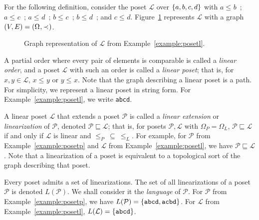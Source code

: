 \documentclass[12pt]{llncs}
\DeclarePairedDelimiter{\set}{\{}{\}}
\DeclarePairedDelimiter{\tuple}{(}{)}
\let\oldleq\leq
\renewcommand{\leq}[1][]{\oldleq_{#1}}
\newcommand{\poset}[1]{\mathcal{#1}}
\newcommand{\uni}[1][]{\Omega_{#1}}
\newcommand{\lang}[1]{L(#1)}
\newcommand{\lin}[1]{\texttt{#1}}
\newcommand{\lext}{\sqsubseteq}
\newcommand{\covered}[1][]{\prec_{#1}}
\begin{document}
\begin{example}
    For the following definition, consider the poset $\poset{L}$ over $\set{a,b,c,d}$ with $a \leq b$\ ; $a \leq c$\ ; $a \leq d$\ ; $b \leq c$\ ; $b \leq d$\ ; and $c \leq d$. Figure~\ref{figure:posetl} represents $\poset{L}$ with a graph $\tuple{V,E} = \tuple{\uni,\covered}$.
    \label{example:posetl}
\end{example}

\begin{figure}[H]
    \centering
    \caption{Graph representation of $\poset{L}$ from Example~\ref{example:posetl}.}
    \label{figure:posetl}
\end{figure}

A partial order where every pair of elements is comparable is called a \emph{linear order}, and a poset $\poset{L}$ with such an order is called a \emph{linear poset}; that is, for $x, y \!\in\! \poset{L}$, $x \leq y$ or $y \leq x$. Note that the graph describing a linear poset is a path. For simplicity, we represent a linear poset in string form. For Example~\ref{example:posetl}, we write \lin{abcd}.

A linear poset $\poset{L}$ that extends a poset $\poset{P}$ is called a \emph{linear extension} or \emph{linearization} of $\poset{P}$, denoted $\poset{P} \lext \poset{L}$; that is, for posets $\poset{P},\poset{L}$ with $\uni[P] \!=\! \uni[L]$, $\poset{P} \lext \poset{L}$ if and only if $\poset{L}$ is linear and $\leq[P] \>\subseteq\> \leq[L]$. For example, for $\poset{P}$ from Example~\ref{example:posetp} and $\poset{L}$ from Example~\ref{example:posetl}, we have $\poset{P} \lext \poset{L}$. Note that a linearization of a poset is equivalent to a topological sort of the graph describing that poset.

Every poset admits a set of linearizations. The set of all linearizations of a poset $\poset{P}$ is denoted $\lang{\poset{P}}$. We shall consider it the \emph{language} of $\poset{P}$. For $\poset{P}$ from Example~\ref{example:posetp}, we have $\lang{\poset{P}} = \set{\lin{abcd},\lin{acbd}}$. For $\poset{L}$ from Example~\ref{example:posetl}, $\lang{\poset{L}} = \set{\lin{abcd}}$.
\end{document}
